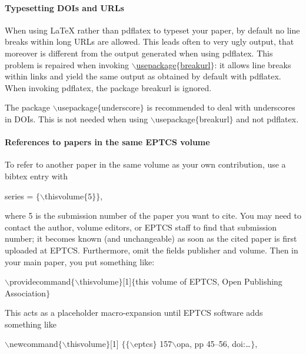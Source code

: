 \documentclass[submission,copyright,creativecommons]{eptcs}
\begin{document}
\paragraph{Typesetting DOIs and URLs}

When using {\LaTeX} rather than {\ttfamily pdflatex} to typeset your paper, by
default no line breaks within long URLs are allowed. This leads often
to very ugly output, that moreover is different from the output
generated when using {\ttfamily pdflatex}. This problem is repaired when
invoking \href{http://eptcs.web.cse.unsw.edu.au/breakurl.sty}
{\ttfamily $\backslash$usepackage$\{$breakurl$\}$}: it allows line breaks
within links and yield the same output as obtained by default with
{\ttfamily pdflatex}.
When invoking {\ttfamily pdflatex}, the package {\ttfamily breakurl} is ignored.

The package {\ttfamily $\backslash$usepackage$\{$underscore$\}$} is
recommended to deal with underscores in DOIs. This is not needed when
using {\ttfamily $\backslash$usepackage$\{$breakurl$\}$} and not {\ttfamily pdflatex}.

\paragraph{References to papers in the same EPTCS volume}

To refer to another paper in the same volume as your own contribution,
use a bibtex entry with
\begin{center}
  {\ttfamily series    = $\{\backslash$thisvolume$\{5\}\}$},
\end{center}
where 5 is the submission number of the paper you want to cite.
You may need to contact the author, volume editors, or EPTCS staff to
find that submission number; it becomes known (and unchangeable)
as soon as the cited paper is first uploaded at EPTCS\@.
Furthermore, omit the fields {\ttfamily publisher} and {\ttfamily volume}.
Then in your main paper, you put something like:

\noindent
{\small \ttfamily $\backslash$providecommand$\{\backslash$thisvolume$\}$[1]$\{$this
  volume of EPTCS, Open Publishing Association$\}$}

\noindent
This acts as a placeholder macro-expansion until EPTCS software adds
something like

\noindent
{\small \ttfamily $\backslash$newcommand$\{\backslash$thisvolume$\}$[1]%
  $\{\{\backslash$eptcs$\}$ 157$\backslash$opa, pp 45--56, doi:\dots$\}$},
\end{document}

